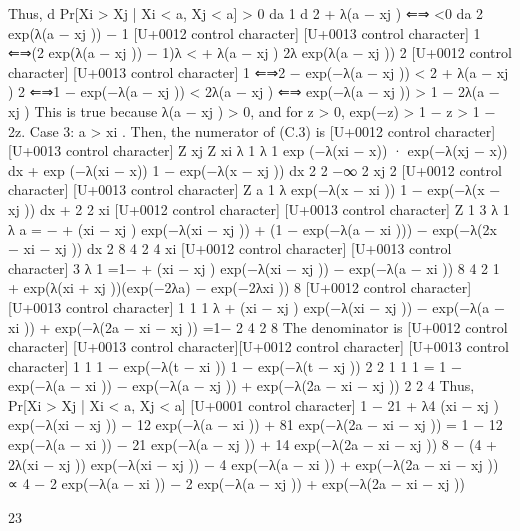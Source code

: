 \documentclass[10pt]{article}
\begin{document}
\begin{ReviewVerbatim}
Thus,
d
Pr[Xi > Xj | Xi < a, Xj < a] > 0
da
1
d
2 + λ(a − xj )
⇐⇒
<0
da 2 exp(λ(a − xj )) − 1
[U+0012 control character]
[U+0013 control character]
1
⇐⇒(2 exp(λ(a − xj )) − 1)λ <
+ λ(a − xj ) 2λ exp(λ(a − xj ))
2
[U+0012 control character]
[U+0013 control character]
1
⇐⇒2 − exp(−λ(a − xj )) < 2
+ λ(a − xj )
2
⇐⇒1 − exp(−λ(a − xj )) < 2λ(a − xj )
⇐⇒ exp(−λ(a − xj )) > 1 − 2λ(a − xj )
This is true because λ(a − xj ) > 0, and for z > 0,
exp(−z) > 1 − z > 1 − 2z.
Case 3: a > xi .
Then, the numerator of (C.3) is
[U+0012 control character]
[U+0013 control character]
Z xj
Z xi
λ
1
λ
1
exp (−λ(xi − x)) · exp(−λ(xj − x)) dx +
exp (−λ(xi − x)) 1 − exp(−λ(x − xj )) dx
2
2
−∞ 2
xj 2
[U+0012 control character]
[U+0013 control character]
Z a
1
λ
exp(−λ(x − xi )) 1 − exp(−λ(x − xj )) dx
+
2
2
xi
[U+0012 control character]
[U+0013 control character]
Z
1
3 λ
1
λ a
= −
+ (xi − xj ) exp(−λ(xi − xj )) + (1 − exp(−λ(a − xi ))) −
exp(−λ(2x − xi − xj )) dx
2
8
4
2
4 xi
[U+0012 control character]
[U+0013 control character]
3 λ
1
=1−
+ (xi − xj ) exp(−λ(xi − xj )) − exp(−λ(a − xi ))
8
4
2
1
+ exp(λ(xi + xj ))(exp(−2λa) − exp(−2λxi ))
8 [U+0012 control character]
[U+0013 control character]
1
1
1 λ
+ (xi − xj ) exp(−λ(xi − xj )) − exp(−λ(a − xi )) + exp(−λ(2a − xi − xj ))
=1−
2
4
2
8
The denominator is
[U+0012 control character]
[U+0013 control character][U+0012 control character]
[U+0013 control character]
1
1
1 − exp(−λ(t − xi ))
1 − exp(−λ(t − xj ))
2
2
1
1
1
= 1 − exp(−λ(a − xi )) − exp(−λ(a − xj )) + exp(−λ(2a − xi − xj ))
2
2
4
Thus,
Pr[Xi > Xj | Xi < a, Xj < a]
[U+0001 control character]
1 − 21 + λ4 (xi − xj ) exp(−λ(xi − xj )) − 12 exp(−λ(a − xi )) + 81 exp(−λ(2a − xi − xj ))
=
1 − 12 exp(−λ(a − xi )) − 21 exp(−λ(a − xj )) + 14 exp(−λ(2a − xi − xj ))
8 − (4 + 2λ(xi − xj )) exp(−λ(xi − xj )) − 4 exp(−λ(a − xi )) + exp(−λ(2a − xi − xj ))
∝
4 − 2 exp(−λ(a − xi )) − 2 exp(−λ(a − xj )) + exp(−λ(2a − xi − xj ))

23



\end{ReviewVerbatim}
\end{document}

